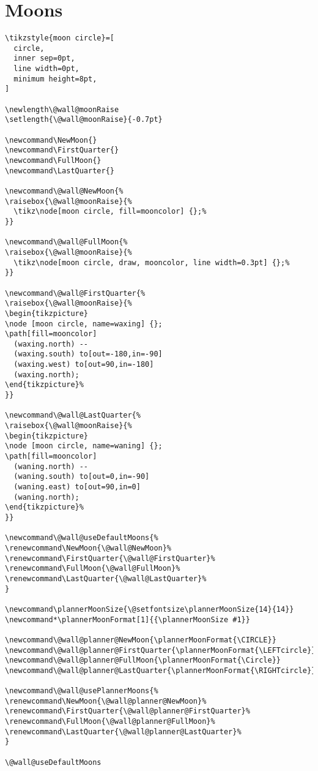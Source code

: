 \documentclass[11pt,oneside]{memoir-article}
\begin{document}
\section{Moons}
\label{sec:org6fefa39}

\begin{verbatim}
\tikzstyle{moon circle}=[
  circle,
  inner sep=0pt,
  line width=0pt,
  minimum height=8pt,
]

\newlength\@wall@moonRaise
\setlength{\@wall@moonRaise}{-0.7pt}

\newcommand\NewMoon{}
\newcommand\FirstQuarter{}
\newcommand\FullMoon{}
\newcommand\LastQuarter{}

\newcommand\@wall@NewMoon{%
\raisebox{\@wall@moonRaise}{%
  \tikz\node[moon circle, fill=mooncolor] {};%
}}

\newcommand\@wall@FullMoon{%
\raisebox{\@wall@moonRaise}{%
  \tikz\node[moon circle, draw, mooncolor, line width=0.3pt] {};%
}}

\newcommand\@wall@FirstQuarter{%
\raisebox{\@wall@moonRaise}{%
\begin{tikzpicture}
\node [moon circle, name=waxing] {};
\path[fill=mooncolor]
  (waxing.north) --
  (waxing.south) to[out=-180,in=-90]
  (waxing.west) to[out=90,in=-180]
  (waxing.north);
\end{tikzpicture}%
}}

\newcommand\@wall@LastQuarter{%
\raisebox{\@wall@moonRaise}{%
\begin{tikzpicture}
\node [moon circle, name=waning] {};
\path[fill=mooncolor]
  (waning.north) --
  (waning.south) to[out=0,in=-90]
  (waning.east) to[out=90,in=0]
  (waning.north);
\end{tikzpicture}%
}}

\newcommand\@wall@useDefaultMoons{%
\renewcommand\NewMoon{\@wall@NewMoon}%
\renewcommand\FirstQuarter{\@wall@FirstQuarter}%
\renewcommand\FullMoon{\@wall@FullMoon}%
\renewcommand\LastQuarter{\@wall@LastQuarter}%
}

\newcommand\plannerMoonSize{\@setfontsize\plannerMoonSize{14}{14}}
\newcommand*\plannerMoonFormat[1]{{\plannerMoonSize #1}}

\newcommand\@wall@planner@NewMoon{\plannerMoonFormat{\CIRCLE}}
\newcommand\@wall@planner@FirstQuarter{\plannerMoonFormat{\LEFTcircle}}
\newcommand\@wall@planner@FullMoon{\plannerMoonFormat{\Circle}}
\newcommand\@wall@planner@LastQuarter{\plannerMoonFormat{\RIGHTcircle}}

\newcommand\@wall@usePlannerMoons{%
\renewcommand\NewMoon{\@wall@planner@NewMoon}%
\renewcommand\FirstQuarter{\@wall@planner@FirstQuarter}%
\renewcommand\FullMoon{\@wall@planner@FullMoon}%
\renewcommand\LastQuarter{\@wall@planner@LastQuarter}%
}

\@wall@useDefaultMoons
\end{verbatim}
\end{document}

